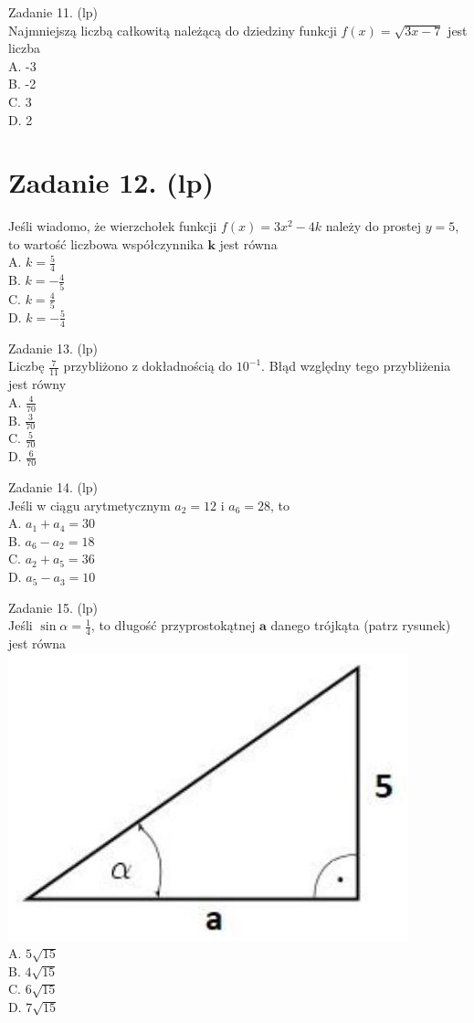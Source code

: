 \documentclass[10pt]{article}
\begin{document}
Zadanie 11. (lp)\\
Najmniejszą liczbą całkowitą należącą do dziedziny funkcji \(f(x)=\sqrt{3 x-7}\) jest liczba\\
A. -3\\
B. -2\\
C. 3\\
D. 2

\section*{Zadanie 12. (lp)}
Jeśli wiadomo, że wierzchołek funkcji \(f(x)=3 x^{2}-4 k\) należy do prostej \(y=5\), to wartość liczbowa współczynnika \(\boldsymbol{k}\) jest równa\\
A. \(k=\frac{5}{4}\)\\
B. \(k=-\frac{4}{5}\)\\
C. \(k=\frac{4}{5}\)\\
D. \(k=-\frac{5}{4}\)

Zadanie 13. (lp)\\
Liczbę \(\frac{7}{11}\) przybliżono z dokładnością do \(10^{-1}\). Błąd względny tego przybliżenia jest równy\\
A. \(\frac{4}{70}\)\\
B. \(\frac{3}{70}\)\\
C. \(\frac{5}{70}\)\\
D. \(\frac{6}{70}\)

Zadanie 14. (lp)\\
Jeśli w ciągu arytmetycznym \(a_{2}=12\) i \(a_{6}=28\), to\\
A. \(a_{1}+a_{4}=30\)\\
B. \(a_{6}-a_{2}=18\)\\
C. \(a_{2}+a_{5}=36\)\\
D. \(a_{5}-a_{3}=10\)

Zadanie 15. (lp)\\
Jeśli \(\sin \alpha=\frac{1}{4}\), to długość przyprostokątnej \(\boldsymbol{a}\) danego trójkąta (patrz rysunek) jest równa\\
\includegraphics[max width=\textwidth, center]{2024_11_21_92d5a9232f32cac9f1a4g-04(1)}\\
A. \(5 \sqrt{15}\)\\
B. \(4 \sqrt{15}\)\\
C. \(6 \sqrt{15}\)\\
D. \(7 \sqrt{15}\)
\end{document}
